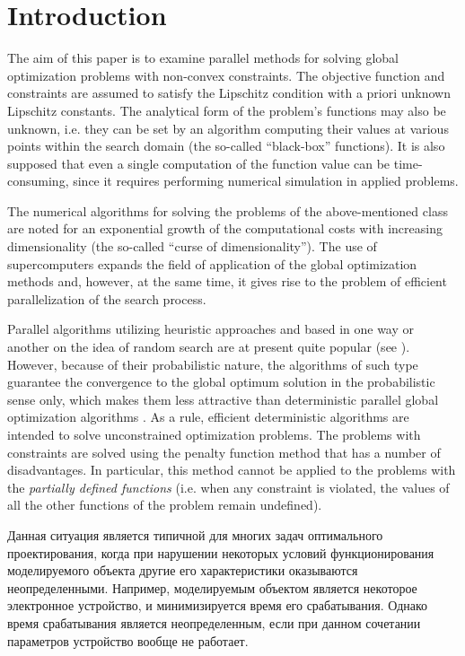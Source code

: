 \documentclass[smallextended]{svjour3}       %
\begin{document}
\section{Introduction}
\label{intro}

The aim of this paper is to examine parallel methods for solving global optimization problems with non-convex constraints. The objective function and constraints are assumed to satisfy the Lipschitz condition with a priori unknown Lipschitz constants. The analytical form of the problem's functions may also be unknown, i.e. they can be set by an algorithm computing their values at various points within the search domain (the so-called ``black-box'' functions). It is also supposed that even a single computation of the function value can be time-consuming, since it requires performing numerical simulation in applied problems. 

The numerical algorithms for solving the problems of the above-mentioned class are noted for an exponential growth of the computational costs with increasing dimensionality (the so-called ``curse of dimensionality''). The use of supercomputers expands the field of application of the global optimization methods and, however, at the same time, it gives rise to the problem of efficient parallelization of the search process.

Parallel algorithms utilizing heuristic approaches and based in one way or another on the idea of random search are at present quite popular (see \cite{RefFerreiro,RefZhu,Korosec,Guerrero}). However, because of their probabilistic nature, the algorithms of such type guarantee the convergence to the global optimum solution in the probabilistic sense only, which makes them less attractive than deterministic parallel global optimization algorithms \cite{Jones2001,Paulavicius2011,Evtushenko2013,Strongin2000}. As a rule, efficient deterministic algorithms are intended to solve unconstrained optimization problems. The problems with constraints are solved using the penalty function method that has a number of disadvantages. In particular, this method cannot be applied to the problems with the \textit{partially defined functions} (i.e. when any constraint is violated, the values of all the other functions of the problem remain undefined).

\Russian
Данная ситуация является типичной для многих задач оптимального проектирования, когда при нарушении некоторых условий функционирования моделируемого объекта другие его характеристики оказываются неопределенными. Например, моделируемым объектом является некоторое электронное устройство, и минимизируется время его срабатывания. Однако время срабатывания является неопределенным, если при данном сочетании параметров устройство вообще не работает.
\end{document}
